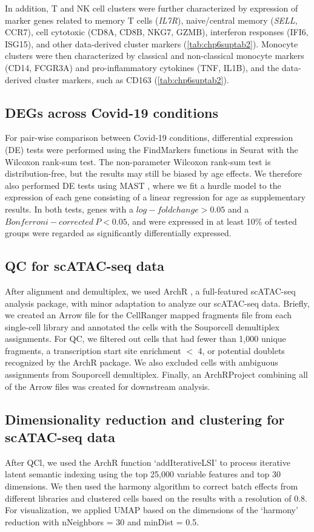\documentclass{book}
\begin{document}
\begin{refsection}
In addition, T and NK cell clusters were further characterized by expression of marker genes related to memory T cells (\textit{IL7R}), naive/central memory (\textit{SELL}, CCR7), cell cytotoxic (CD8A, CD8B, NKG7, GZMB), interferon responses (IFI6, ISG15), and other data-derived cluster markers (\ref{tab:chp6suptab2}).
Monocyte clusters were then characterized by classical and non-classical monocyte markers (CD14, FCGR3A) and pro-inflammatory cytokines (TNF, IL1B), and the data-derived cluster markers, such as CD163 (\ref{tab:chp6suptab2}).

\subsection*{DEGs across Covid-19 conditions}
For pair-wise comparison between Covid-19 conditions, differential expression (DE) tests were performed using the FindMarkers functions in Seurat with the Wilcoxon rank-sum test.
The non-parameter Wilcoxon rank-sum test is distribution-free, but the results may still be biased by age effects.
We therefore also performed DE tests using MAST \cite{Finak2015MAST}, where we fit a hurdle model to the expression of each gene consisting of a linear regression for age as supplementary results.
In both tests, genes with a $log-fold change > 0.05$ and a $Bonferroni-corrected~P < 0.05$, and were expressed in at least 10\% of tested groups were regarded as significantly differentially expressed.

\subsection*{QC for scATAC-seq data}
After alignment and demultiplex, we used ArchR \cite{Granja2021ArchR}, a full-featured scATAC-seq analysis package, with minor adaptation to analyze our scATAC-seq data.
Briefly, we created an Arrow file for the CellRanger mapped fragments file from each single-cell library and annotated the cells with the Souporcell demultiplex assignments.
For QC, we filtered out cells that had fewer than 1,000 unique fragments, a transcription start site enrichment $<$ 4, or potential doublets recognized by the ArchR package.
We also excluded cells with ambiguous assignments from Souporcell demultiplex.
Finally, an ArchRProject combining all of the Arrow files was created for downstream analysis.

\subsection*{Dimensionality reduction and clustering for scATAC-seq data}
After QCl, we used the ArchR function ‘addIterativeLSI’ to process iterative latent semantic indexing using the top 25,000 variable features and top 30 dimensions.
We then used the harmony algorithm to correct batch effects from different libraries and clustered cells based on the results with a resolution of 0.8.
For visualization, we applied UMAP based on the dimensions of the ‘harmony’ reduction with nNeighbors = 30 and minDist = 0.5.


\end{refsection}
\end{document}
